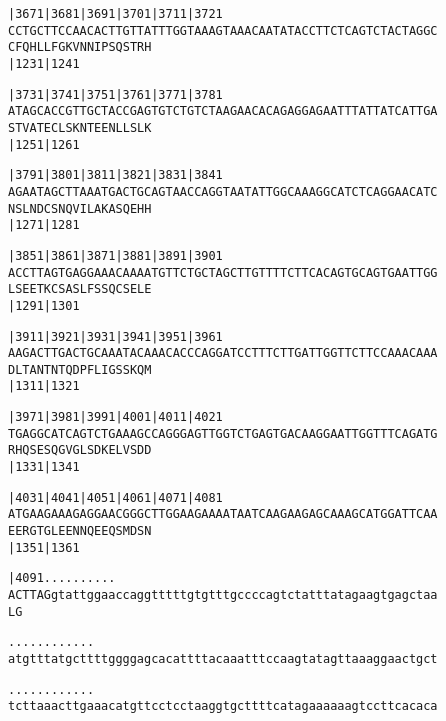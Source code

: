 \documentclass{article}
\begin{document}
\newpage
\begin{alltt}
|3671     |3681     |3691     |3701     |3711     |3721     
CCTGCTTCCAACACTTGTTATTTGGTAAAGTAAACAATATACCTTCTCAGTCTACTAGGC
  C  F  Q  H  L  L  F  G  K  V  N  N  I  P  S  Q  S  T  R  H
                    |1231                         |1241     

|3731     |3741     |3751     |3761     |3771     |3781     
ATAGCACCGTTGCTACCGAGTGTCTGTCTAAGAACACAGAGGAGAATTTATTATCATTGA
  S  T  V  A  T  E  C  L  S  K  N  T  E  E  N  L  L  S  L  K
                    |1251                         |1261     

|3791     |3801     |3811     |3821     |3831     |3841     
AGAATAGCTTAAATGACTGCAGTAACCAGGTAATATTGGCAAAGGCATCTCAGGAACATC
  N  S  L  N  D  C  S  N  Q  V  I  L  A  K  A  S  Q  E  H  H
                    |1271                         |1281     

|3851     |3861     |3871     |3881     |3891     |3901     
ACCTTAGTGAGGAAACAAAATGTTCTGCTAGCTTGTTTTCTTCACAGTGCAGTGAATTGG
  L  S  E  E  T  K  C  S  A  S  L  F  S  S  Q  C  S  E  L  E
                    |1291                         |1301     

|3911     |3921     |3931     |3941     |3951     |3961     
AAGACTTGACTGCAAATACAAACACCCAGGATCCTTTCTTGATTGGTTCTTCCAAACAAA
  D  L  T  A  N  T  N  T  Q  D  P  F  L  I  G  S  S  K  Q  M
                    |1311                         |1321     

|3971     |3981     |3991     |4001     |4011     |4021     
TGAGGCATCAGTCTGAAAGCCAGGGAGTTGGTCTGAGTGACAAGGAATTGGTTTCAGATG
  R  H  Q  S  E  S  Q  G  V  G  L  S  D  K  E  L  V  S  D  D
                    |1331                         |1341     

|4031     |4041     |4051     |4061     |4071     |4081     
ATGAAGAAAGAGGAACGGGCTTGGAAGAAAATAATCAAGAAGAGCAAAGCATGGATTCAA
  E  E  R  G  T  G  L  E  E  N  N  Q  E  E  Q  S  M  D  S  N
                    |1351                         |1361     

|4091     .    .    .    .    .    .    .    .    .    .    
ACTTAGgtattggaaccaggtttttgtgtttgccccagtctatttatagaagtgagctaa
  L  G                                                      

.    .    .    .    .    .    .    .    .    .    .    .    
atgtttatgcttttggggagcacattttacaaatttccaagtatagttaaaggaactgct

.    .    .    .    .    .    .    .    .    .    .    .    
tcttaaacttgaaacatgttcctcctaaggtgcttttcatagaaaaaagtccttcacaca

\end{alltt}
\end{document}
